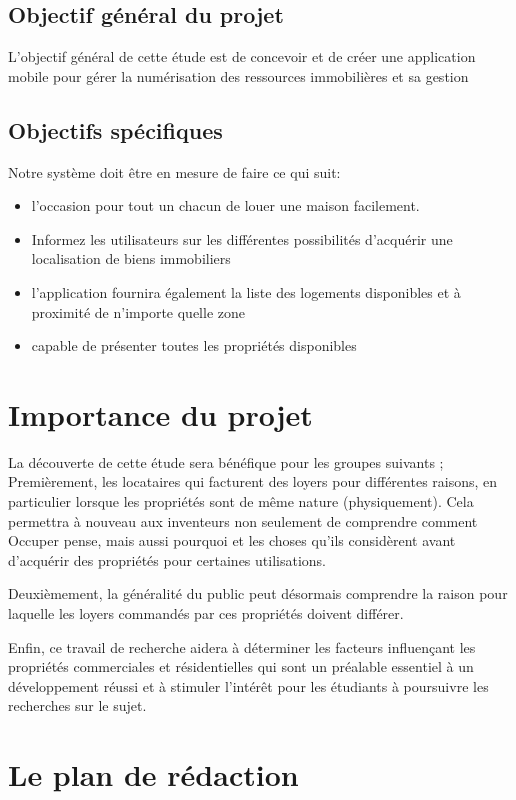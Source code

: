 \documentclass[english,12pt,a4paper]{report}
\begin{document}
\subsection{Objectif général du projet}

L'objectif général de cette étude est de concevoir et de créer une application mobile pour gérer la numérisation des ressources immobilières et sa gestion

\subsection{Objectifs spécifiques}
Notre système doit être en mesure de faire ce qui suit:
\begin{itemize}
	\item 	l'occasion pour tout un chacun de louer une maison facilement.
	\item 	 Informez les utilisateurs sur les différentes possibilités d'acquérir une localisation de biens immobiliers 
	\item l'application fournira également la liste des logements disponibles et à 	proximité de n'importe quelle zone 
	\item 	 capable de présenter toutes les propriétés disponibles
	
\end{itemize}


\section{Importance du projet }
La découverte de cette étude sera bénéfique pour les groupes suivants ; Premièrement, les locataires qui facturent des loyers pour différentes raisons, en particulier lorsque les propriétés sont de même nature (physiquement). Cela permettra à nouveau aux inventeurs non seulement de comprendre comment Occuper pense, mais aussi pourquoi et les choses qu'ils considèrent avant d'acquérir des propriétés pour certaines utilisations.

 Deuxièmement, la généralité du public peut désormais comprendre la raison pour laquelle les loyers commandés par ces propriétés doivent différer. 
 
 Enfin, ce travail de recherche aidera à déterminer les facteurs influençant les propriétés commerciales et résidentielles qui sont un préalable essentiel à un développement réussi et à stimuler l'intérêt pour les étudiants à poursuivre les recherches sur le sujet.


\section{Le plan de rédaction }
\end{document}
